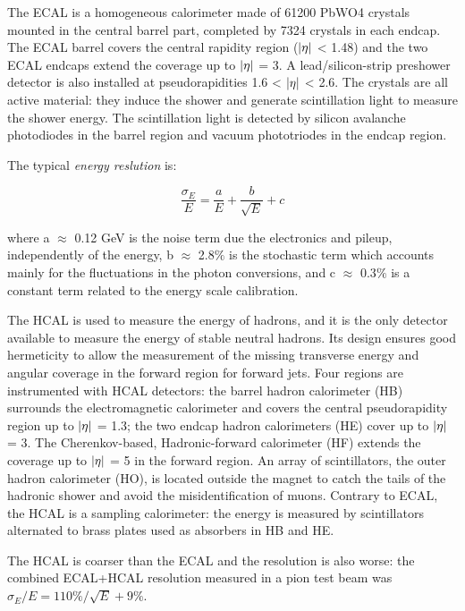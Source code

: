 \begin{outline}
    \1 The ECAL is a homogeneous calorimeter made
    of 61200 PbWO4 crystals mounted in the central barrel part, completed by 7324 crystals in
    each endcap. The ECAL barrel covers the central rapidity region ($\abs{\eta}$ < 1.48) and the two
    ECAL endcaps extend the coverage up to $\abs{\eta}$ = 3. A lead/silicon-strip preshower detector is
    also installed at pseudorapidities 1.6 < $\abs{\eta}$ < 2.6. The crystals are all active material: they
    induce the shower and generate scintillation light to measure the shower energy. The scintillation light is detected by silicon avalanche photodiodes in the barrel region and vacuum
    phototriodes in the endcap region. 
    
    The typical \emph{energy reslution} is:
    
    \begin{equation*}
        \frac{\sigma_E}{E} = \frac{a}{E} + \frac{b}{\sqrt{E}} + c
        \end{equation*}
        
    where a $\approx$ 0.12 GeV is the noise term due the electronics and pileup, independently of the energy, b $\approx$ 2.8$\%$ is
    the stochastic term which accounts mainly for the fluctuations in the photon conversions,
    and c $\approx$ 0.3$\%$ is a constant term related to the energy scale calibration.
    
    \1 The HCAL is used to measure the energy of hadrons, and it
    is the only detector available to measure the energy of stable neutral hadrons. Its design ensures
    good hermeticity to allow the measurement of the missing transverse energy and angular
    coverage in the forward region for forward jets.
    Four regions are instrumented with HCAL detectors: the barrel hadron calorimeter (HB)
    surrounds the electromagnetic calorimeter and covers the central pseudorapidity region up
    to $\abs{\eta}$ = 1.3; the two endcap hadron calorimeters (HE) cover up to $\abs{\eta}$ = 3. The Cherenkov-based, Hadronic-forward
    calorimeter (HF) extends the coverage up to $\abs{\eta}$ = 5 in the forward region. An array of scintillators, the outer hadron calorimeter (HO), is located outside the magnet to catch the tails
    of the hadronic shower and avoid the misidentification of muons. Contrary to ECAL, the HCAL is a sampling calorimeter: the energy is measured by scintillators alternated to brass plates used as absorbers in HB and HE.
    
    The HCAL is coarser than the ECAL and the resolution is also worse:
     the combined ECAL+HCAL resolution measured in a pion test
    beam was $\sigma_E /E = 110\%/\sqrt{E} + 9\%$.
\end{outline}

